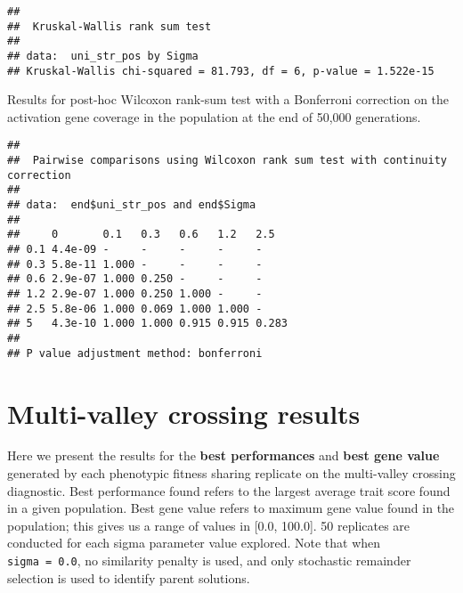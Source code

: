 \documentclass[]{book}
\newenvironment{Shaded}{\begin{snugshade}}{\end{snugshade}}
\newcommand{\DataTypeTok}[1]{\textcolor[rgb]{0.13,0.29,0.53}{#1}}
\newcommand{\KeywordTok}[1]{\textcolor[rgb]{0.13,0.29,0.53}{\textbf{#1}}}
\newcommand{\NormalTok}[1]{#1}
\newcommand{\OperatorTok}[1]{\textcolor[rgb]{0.81,0.36,0.00}{\textbf{#1}}}
\newcommand{\OtherTok}[1]{\textcolor[rgb]{0.56,0.35,0.01}{#1}}
\newcommand{\StringTok}[1]{\textcolor[rgb]{0.31,0.60,0.02}{#1}}
\begin{document}
\begin{verbatim}
## 
##  Kruskal-Wallis rank sum test
## 
## data:  uni_str_pos by Sigma
## Kruskal-Wallis chi-squared = 81.793, df = 6, p-value = 1.522e-15
\end{verbatim}

Results for post-hoc Wilcoxon rank-sum test with a Bonferroni correction on the activation gene coverage in the population at the end of 50,000 generations.

\begin{Shaded}
\end{Shaded}

\begin{verbatim}
## 
##  Pairwise comparisons using Wilcoxon rank sum test with continuity correction 
## 
## data:  end$uni_str_pos and end$Sigma 
## 
##     0       0.1   0.3   0.6   1.2   2.5  
## 0.1 4.4e-09 -     -     -     -     -    
## 0.3 5.8e-11 1.000 -     -     -     -    
## 0.6 2.9e-07 1.000 0.250 -     -     -    
## 1.2 2.9e-07 1.000 0.250 1.000 -     -    
## 2.5 5.8e-06 1.000 0.069 1.000 1.000 -    
## 5   4.3e-10 1.000 1.000 0.915 0.915 0.283
## 
## P value adjustment method: bonferroni
\end{verbatim}

\hypertarget{multi-valley-crossing-results-4}{%
\section{Multi-valley crossing results}\label{multi-valley-crossing-results-4}}

Here we present the results for the \textbf{best performances} and \textbf{best gene value} generated by each phenotypic fitness sharing replicate on the multi-valley crossing diagnostic.
Best performance found refers to the largest average trait score found in a given population.
Best gene value refers to maximum gene value found in the population; this gives us a range of values in {[}0.0, 100.0{]}.
50 replicates are conducted for each sigma parameter value explored.
Note that when \texttt{sigma\ =\ 0.0}, no similarity penalty is used, and only stochastic remainder selection is used to identify parent solutions.
\end{document}
